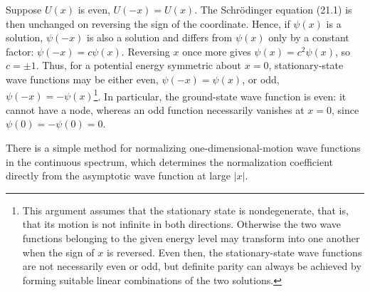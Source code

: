 Suppose $U(x)$ is even, $U(-x)=U(x)$. The Schrödinger equation (21.1) is then
unchanged on reversing the sign of the coordinate. Hence, if $\psi(x)$ is a
solution, $\psi(-x)$ is also a solution and differs from $\psi(x)$ only by a
constant factor: $\psi(-x)=c\psi(x)$. Reversing $x$ once more gives
$\psi(x)=c^2\psi(x)$, so $c=\pm1$. Thus, for a potential energy symmetric
about $x=0$, stationary-state wave functions may be either even,
$\psi(-x)=\psi(x)$,%
or odd, $\psi(-x)=-\psi(x)$\footnote{This argument assumes that the stationary
state is nondegenerate, that is, that its motion is not infinite in both
directions. Otherwise the two wave functions belonging to the given energy
level may transform into one another when the sign of $x$ is reversed. Even
then, the stationary-state wave functions are not necessarily
even or odd, but definite parity can always be achieved by forming suitable
linear combinations of the two solutions.}. In particular, the ground-state
wave function is even: it cannot have a node, whereas an odd function
necessarily vanishes at $x=0$, since $\psi(0)=-\psi(0)=0$.

There is a simple method for normalizing one-dimensional-motion wave functions
in the continuous spectrum, which determines the normalization coefficient
directly from the asymptotic wave function at large $|x|$.

